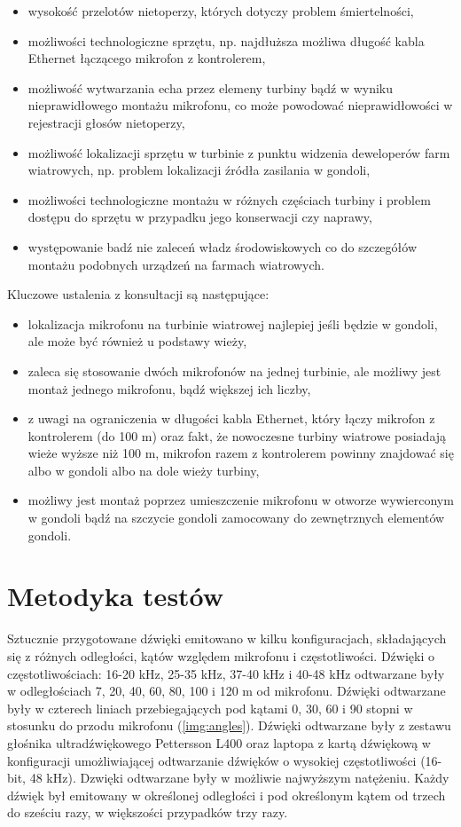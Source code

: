 \documentclass{sprz}
\begin{document}
\begin{itemize}
  \item{wysokość przelotów nietoperzy, których dotyczy problem śmiertelności,}
  \item{możliwości technologiczne sprzętu, np. najdłuższa możliwa długość kabla Ethernet łączącego mikrofon z kontrolerem,}
  \item{możliwość wytwarzania echa przez elemeny turbiny bądź w wyniku nieprawidłowego montażu mikrofonu, co może powodować nieprawidłowości w rejestracji głosów nietoperzy,}
  \item{możliwość lokalizacji sprzętu w turbinie z punktu widzenia deweloperów farm wiatrowych, np. problem lokalizacji źródła zasilania w gondoli,}
  \item {możliwości technologiczne montażu w różnych częściach turbiny i problem dostępu do sprzętu w przypadku jego konserwacji czy naprawy,}
  \item {występowanie badź nie zaleceń władz środowiskowych co do szczegółów montażu podobnych urządzeń na farmach wiatrowych.}
\end{itemize}

Kluczowe ustalenia z konsultacji są następujące:
\begin{itemize}
  \item{lokalizacja mikrofonu na turbinie wiatrowej najlepiej jeśli będzie w gondoli, ale może być również u podstawy wieży,}
  \item{zaleca się stosowanie dwóch mikrofonów na jednej turbinie, ale możliwy jest montaż jednego mikrofonu, bądź większej ich liczby,}
  \item{z uwagi na ograniczenia w długości kabla Ethernet, który łączy mikrofon z kontrolerem (do 100 m) oraz fakt, że nowoczesne turbiny wiatrowe posiadają wieże wyższe niż 100 m, mikrofon razem z kontrolerem powinny znajdować się albo w gondoli albo na dole wieży turbiny,}
  \item{możliwy jest montaż poprzez umieszczenie mikrofonu w otworze wywierconym w gondoli bądź na szczycie gondoli zamocowany do zewnętrznych elementów gondoli.}
\end{itemize}

\section{Metodyka testów}
Sztucznie przygotowane dźwięki emitowano w kilku konfiguracjach, składających się z różnych odległości, kątów względem mikrofonu i częstotliwości. Dźwięki o częstotliwościach: 16-20 kHz, 25-35 kHz, 37-40 kHz i 40-48 kHz odtwarzane były w odległościach 7, 20, 40, 60, 80, 100 i 120 m od mikrofonu. Dźwięki odtwarzane były w czterech liniach przebiegających pod kątami 0, 30, 60 i 90 stopni w stosunku do przodu mikrofonu (\ref{img:angles}). Dźwięki odtwarzane były z zestawu głośnika ultradźwiękowego Pettersson L400 oraz laptopa z kartą dźwiękową w konfiguracji umożliwiającej odtwarzanie dźwięków o wysokiej częstotliwości (16-bit, 48 kHz). Dzwięki odtwarzane były w możliwie najwyższym natężeniu. Każdy dźwięk był emitowany w określonej odległości i pod określonym kątem od trzech do sześciu razy, w większości przypadków trzy razy.
\end{document}

